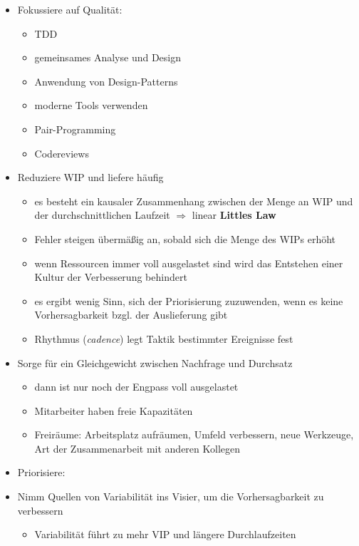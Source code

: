 \begin{itemize}
  \item Fokussiere auf Qualität:
    \begin{itemize}
      \item TDD
      \item gemeinsames Analyse und Design
      \item Anwendung von Design-Patterns
      \item moderne Tools verwenden
      \item Pair-Programming
      \item Codereviews
    \end{itemize}
  \item Reduziere WIP und liefere häufig
    \begin{itemize}
      \item es besteht ein kausaler Zusammenhang zwischen der Menge an WIP und der durchschnittlichen
        Laufzeit $\Rightarrow$  linear  \textbf{Littles Law}
      \item Fehler steigen übermäßig an, sobald sich die Menge des WIPs erhöht
      \item wenn Ressourcen immer voll ausgelastet sind wird das Entstehen einer Kultur der Verbesserung
        behindert
      \item es ergibt wenig Sinn, sich der Priorisierung zuzuwenden, wenn es keine Vorhersagbarkeit
        bzgl. der Auslieferung gibt
      \item Rhythmus (\textit{cadence}) legt Taktik bestimmter Ereignisse fest
    \end{itemize}
  \item Sorge für ein Gleichgewicht zwischen Nachfrage und Durchsatz
    \begin{itemize}
      \item dann ist nur noch der Engpass voll ausgelastet
      \item Mitarbeiter haben freie Kapazitäten
      \item Freiräume: Arbeitsplatz aufräumen, Umfeld verbessern, neue Werkzeuge, Art der
        Zusammenarbeit mit anderen Kollegen
    \end{itemize}
  \item Priorisiere:

  \item Nimm Quellen von Variabilität ins Visier, um die Vorhersagbarkeit zu verbessern
    \begin{itemize}
      \item Variabilität führt zu mehr VIP und längere Durchlaufzeiten
    \end{itemize}
\end{itemize}


